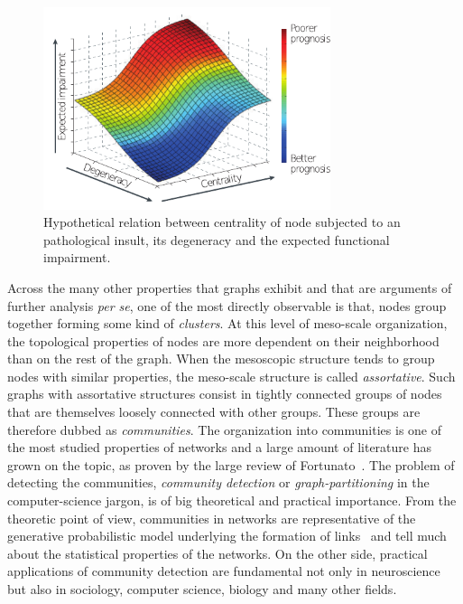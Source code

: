 \begin{figure}[htb!]
\centering
\includegraphics[width=0.75\textwidth]{images/prognosis.pdf}
\caption{Hypothetical relation between centrality of node subjected to an pathological insult, its degeneracy and the expected functional impairment.}
\label{fig:prognosis_centrality}
\end{figure}

Across the many other properties that graphs exhibit and that are arguments of further analysis \emph{per se}, one of the most directly observable is that, nodes group together forming some kind of \emph{clusters}.
At this level of meso-scale organization, the topological properties of nodes are more dependent on their neighborhood than on the rest of the graph. When the mesoscopic structure tends to group nodes with similar properties, the meso-scale structure is called \emph{assortative}. Such graphs with assortative structures consist in tightly connected groups of nodes that are themselves loosely connected with other groups. These groups are therefore dubbed as \emph{communities}. 
The organization into communities is one of the most studied properties of networks and a large amount of literature has grown on the topic, as proven by the large review of Fortunato~\cite{fortunato2010}.
The problem of detecting the communities, \emph{community detection} or \emph{graph-partitioning} in the computer-science jargon, is of big theoretical and practical importance.
From the theoretic point of view, communities in networks are representative of the generative probabilistic model underlying the formation of links~\cite{karrer2011} and tell much about the statistical properties of the networks.
On the other side, practical applications of community detection are fundamental not only in neuroscience but also in sociology, computer science, biology and many other fields.

